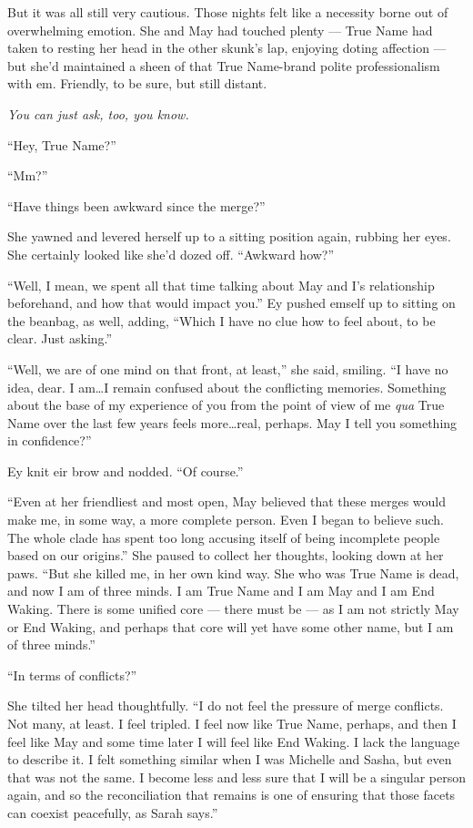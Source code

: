But it was all still very cautious. Those nights felt like a necessity borne out of overwhelming emotion. She and May had touched plenty — True Name had taken to resting her head in the other skunk's lap, enjoying doting affection — but she'd maintained a sheen of that True Name-brand polite professionalism with em. Friendly, to be sure, but still distant.

\emph{You can just ask, too, you know.}

``Hey, True Name?''

``Mm?''

``Have things been awkward since the merge?''

She yawned and levered herself up to a sitting position again, rubbing her eyes. She certainly looked like she'd dozed off. ``Awkward how?''

``Well, I mean, we spent all that time talking about May and I's relationship beforehand, and how that would impact you.'' Ey pushed emself up to sitting on the beanbag, as well, adding, ``Which I have no clue how to feel about, to be clear. Just asking.''

``Well, we are of one mind on that front, at least,'' she said, smiling. ``I have no idea, dear. I am\ldots I remain confused about the conflicting memories. Something about the base of my experience of you from the point of view of me \emph{qua} True Name over the last few years feels more\ldots real, perhaps. May I tell you something in confidence?''

Ey knit eir brow and nodded. ``Of course.''

``Even at her friendliest and most open, May believed that these merges would make me, in some way, a more complete person. Even I began to believe such. The whole clade has spent too long accusing itself of being incomplete people based on our origins.'' She paused to collect her thoughts, looking down at her paws. ``But she killed me, in her own kind way. She who was True Name is dead, and now I am of three minds. I am True Name and I am May and I am End Waking. There is some unified core — there must be — as I am not strictly May or End Waking, and perhaps that core will yet have some other name, but I am of three minds.''

``In terms of conflicts?''

She tilted her head thoughtfully. ``I do not feel the pressure of merge conflicts. Not many, at least. I feel tripled. I feel now like True Name, perhaps, and then I feel like May and some time later I will feel like End Waking. I lack the language to describe it. I felt something similar when I was Michelle and Sasha, but even that was not the same. I become less and less sure that I will be a singular person again, and so the reconciliation that remains is one of ensuring that those facets can coexist peacefully, as Sarah says.''

